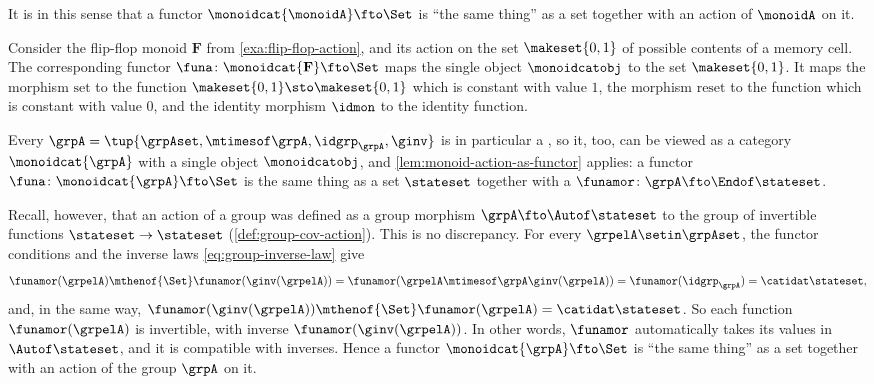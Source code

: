 It is in this sense that a functor $\monoidcat{\monoidA} \fto \Set$ is ``the same thing'' as a set together with an action of $\monoidA$ on it.

\begin{example}
    Consider the flip-flop monoid $\mathbf{F}$ from \cref{exa:flip-flop-action}, and its action on the set $\makeset{0, 1}$ of possible contents of a memory cell.
    The corresponding functor $\funa \colon \monoidcat{\mathbf{F}} \fto \Set$ maps the single object $\monoidcatobj$ to the set $\makeset{0, 1}$.
    It maps the morphism $\text{set}$ to the function $\makeset{0, 1} \sto \makeset{0, 1}$ which is constant with value $1$, the morphism $\text{reset}$ to the function which is constant with value $0$, and the identity morphism $\idmon$ to the identity function.
\end{example}

\begin{remark}
    \label{rem:group-actions-as-functors}
    Every  $\grpA = \tup{\grpAset, \mtimesof\grpA, \idgrp_\grpA, \ginv}$ is in particular a , so it, too, can be viewed as a category $\monoidcat{\grpA}$ with a single object $\monoidcatobj$, and \cref{lem:monoid-action-as-functor} applies: a functor $\funa \colon \monoidcat{\grpA} \fto \Set$ is the same thing as a set $\stateset$ together with a  $\funamor \colon \grpA \fto \Endof\stateset$.

    Recall, however, that an action of a group was defined as a group morphism $\grpA \fto \Autof\stateset$ to the group of invertible functions $\stateset \to \stateset$ (\cref{def:group-cov-action}).
    This is no discrepancy.
    For every $\grpelA \setin \grpAset$, the functor conditions and the inverse laws \cref{eq:group-inverse-law} give
    \begin{equation}
        \funamor(\grpelA) \mthenof{\Set} \funamor(\ginv(\grpelA)) = \funamor(\grpelA \mtimesof\grpA \ginv(\grpelA)) = \funamor(\idgrp_\grpA) = \catidat\stateset,
    \end{equation}
    and, in the same way, $\funamor(\ginv(\grpelA)) \mthenof{\Set} \funamor(\grpelA) = \catidat\stateset$.
    So each function $\funamor(\grpelA)$ is invertible, with inverse $\funamor(\ginv(\grpelA))$.
    In other words, $\funamor$ automatically takes its values in $\Autof\stateset$, and it is compatible with inverses.
    Hence a functor $\monoidcat{\grpA} \fto \Set$ is ``the same thing'' as a set together with an action of the group $\grpA$ on it.
\end{remark}

